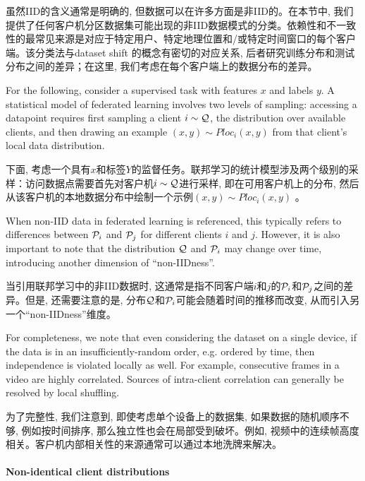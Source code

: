 虽然IID的含义通常是明确的, 但数据可以在许多方面是非IID的。在本节中, 我们提供了任何客户机分区数据集可能出现的非IID数据模式的分类。依赖性和不一致性的最常见来源是对应于特定用户、特定地理位置和/或特定时间窗口的每个客户端。该分类法与dataset shift \citep{torres2012unifying,candela2009datasetshift} 的概念有密切的对应关系, 后者研究训练分布和测试分布之间的差异；在这里, 我们考虑在每个客户端上的数据分布的差异。


For the following, consider a supervised task with features $x$ and labels $y$. A statistical model of federated learning involves two levels of sampling: accessing a datapoint requires first sampling a client $i \sim \mathcal{Q}$, the distribution over available clients, and then drawing an example $(x, y)\sim Ploc_i(x, y)$ from that client's local data distribution. 

下面, 考虑一个具有$x$和标签$Y$的监督任务。联邦学习的统计模型涉及两个级别的采样：访问数据点需要首先对客户机$i\sim\mathcal{Q}$进行采样, 即在可用客户机上的分布, 然后从该客户机的本地数据分布中绘制一个示例$(x, y)\sim Ploc_i(x, y)$ 。


When non-IID data in federated learning is referenced, this typically refers to differences between $\mathcal{P}_i$ and $\mathcal{P}_j$ for different clients $i$ and $j$.  However, it is also important to note that the distribution $\mathcal{Q}$ and $\mathcal{P}_i$ may change over time, introducing another dimension of ``non-IIDness''. 

当引用联邦学习中的非IID数据时, 这通常是指不同客户端$i$和$j$的$\mathcal{P}_i$和$\mathcal{P}_j$之间的差异。但是, 还需要注意的是, 分布$\mathcal{Q}$和$\mathcal{P}_i$可能会随着时间的推移而改变, 从而引入另一个``non-IIDness''维度。

For completeness, we note that even considering the dataset on a single device, if the data is in an insufficiently-random order, e.g. ordered by time, then independence is violated locally as well.  For example, consecutive frames in a video are highly correlated. Sources of intra-client correlation can generally be resolved by local shuffling.

为了完整性, 我们注意到, 即使考虑单个设备上的数据集, 如果数据的随机顺序不够, 例如按时间排序, 那么独立性也会在局部受到破坏。例如, 视频中的连续帧高度相关。客户机内部相关性的来源通常可以通过本地洗牌来解决。

\paragraph{Non-identical client distributions}

